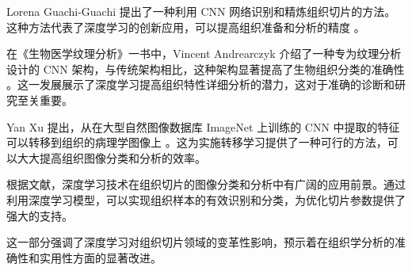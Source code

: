 Lorena Guachi-Guachi 提出了一种利用 CNN 网络识别和精炼组织切片的方法。这种方法代表了深度学习的创新应用，可以提高组织准备和分析的精度 \cite{LR.7}。

在《生物医学纹理分析》一书中，Vincent Andrearczyk 介绍了一种专为纹理分析设计的 CNN 架构，与传统架构相比，这种架构显著提高了生物组织分类的准确性 \cite{LR.8}。这一发展展示了深度学习提高组织特性详细分析的潜力，这对于准确的诊断和研究至关重要。

Yan Xu 提出，从在大型自然图像数据库 ImageNet 上训练的 CNN 中提取的特征可以转移到组织的病理学图像上 \cite{LR.9}。这为实施转移学习提供了一种可行的方法，可以大大提高组织图像分类和分析的效率。

根据文献，深度学习技术在组织切片的图像分类和分析中有广阔的应用前景。通过利用深度学习模型，可以实现组织样本的有效识别和分类，为优化切片参数提供了强大的支持。

这一部分强调了深度学习对组织切片领域的变革性影响，预示着在组织学分析的准确性和实用性方面的显著改进。

\FloatBarrier %

